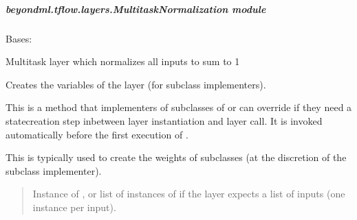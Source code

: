 \documentclass[letterpaper,10pt,english]{sphinxmanual}
\begin{document}
\subparagraph{beyondml.tflow.layers.MultitaskNormalization module}
\label{\detokenize{beyondml.tflow.layers:module-beyondml.tflow.layers.MultitaskNormalization}}\label{\detokenize{beyondml.tflow.layers:beyondml-tflow-layers-multitasknormalization-module}}

\begin{fulllineitems}
\label{\detokenize{beyondml.tflow.layers:beyondml.tflow.layers.MultitaskNormalization.MultitaskNormalization}}
\pysigstartsignatures
{}
\pysigstopsignatures
\sphinxAtStartPar
Bases: 

\sphinxAtStartPar
Multitask layer which normalizes all inputs to sum to 1

\begin{fulllineitems}
\label{\detokenize{beyondml.tflow.layers:beyondml.tflow.layers.MultitaskNormalization.MultitaskNormalization.build}}
\pysigstartsignatures
{}
\pysigstopsignatures
\sphinxAtStartPar
Creates the variables of the layer (for subclass implementers).

\sphinxAtStartPar
This is a method that implementers of subclasses of  or 
can override if they need a state\sphinxhyphen{}creation step in\sphinxhyphen{}between
layer instantiation and layer call. It is invoked automatically before
the first execution of .

\sphinxAtStartPar
This is typically used to create the weights of  subclasses
(at the discretion of the subclass implementer).
\begin{quote}\begin{description}
\sphinxAtStartPar
{} \textendash{} Instance of , or list of instances of
 if the layer expects a list of inputs
(one instance per input).


\end{description}
\end{quote}
\end{fulllineitems}
\end{fulllineitems}
\end{document}
